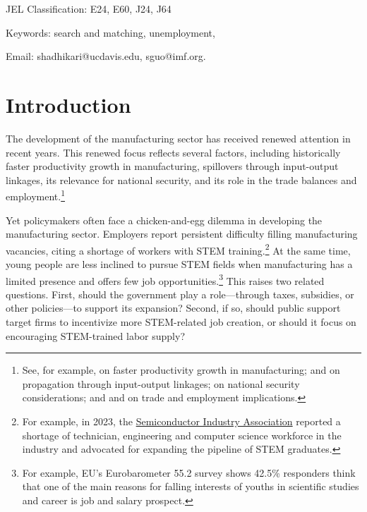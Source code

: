 \documentclass[12pt]{article} %
\theoremstyle{definition}
\begin{document}
\noindent JEL Classification: E24, E60, J24, J64

\noindent Keywords: search and matching, unemployment, 


\vspace{0.6cm}

\noindent \footnotesize Email: shadhikari@ucdavis.edu, sguo@imf.org.

\thispagestyle{empty}


\setcounter{page}{1}
\normalsize




\newpage
\section{Introduction}\label{section intro} 

The development of the manufacturing sector has received renewed attention in recent years. This renewed focus reflects several factors, including historically faster productivity growth in manufacturing, spillovers through input-output linkages, its relevance for national security, and its role in the trade balances and employment.\footnote{See, for example,  \cite{DuarteRestuccia2010} on faster productivity growth in manufacturing; \cite{liu2019industrial} and \cite{mcnerney2022production} on propagation through input-output linkages; \cite{hicks2022securing} on national security considerations; and \cite{autor2013china} and \cite{Rodrik2016} on trade and employment implications.}

Yet policymakers often face a chicken-and-egg dilemma in developing the manufacturing sector. Employers report persistent difficulty filling manufacturing vacancies, citing a shortage of workers with STEM training.\footnote{For example, in 2023, the \href{https://www.semiconductors.org/america-faces-significant-shortage-of-tech-workers-in-semiconductor-industry-and-throughout-u-s-economy/}{Semiconductor Industry Association} reported a shortage of technician, engineering and computer science workforce in the industry and advocated for expanding the pipeline of STEM graduates. } At the same time, young people are less inclined to pursue STEM fields when manufacturing has a limited presence and offers few job opportunities.\footnote{For example, EU's Eurobarometer 55.2 survey shows 42.5\% responders think that one of the main reasons for falling interests of youths in scientific studies and career is job and salary prospect.  } This raises two related questions. First, should the government play a role—through taxes, subsidies, or other policies—to support its expansion? Second, if so, should public support target firms to incentivize more STEM-related job creation, or should it focus on encouraging STEM-trained labor supply?
\end{document}
